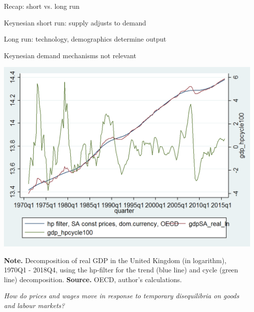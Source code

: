 \documentclass{beamer}
\newcommand{\tb}[1]{{\color{blue}{\textbf{#1}}}}
\newenvironment{mytemize}
{\vfill\itemize[nolistsep,itemsep=\fill,label=\color{blue}{$\triangleright$}]}
  {\enditemize}
\begin{document}
\begin{frame}{Recap: short vs. long run}

\begin{mytemize}
\item Keynesian short run: supply adjusts to demand
\item Long run: technology, demographics determine output
  \begin{mytemize}
	\item Keynesian demand mechanisms not relevant
  \end{mytemize}
  \begin{center}
\includegraphics[trim=0 140 0 0,clip,width=0.55\columnwidth]{FIGURES/8_UKoutputDecomp}
\vspace{0.5mm}
\begin{minipage}{1.0\columnwidth}
\tiny	
\textbf{Note.} Decomposition of real GDP in the United Kingdom (in logarithm), 1970Q1 - 2018Q4, using the hp-filter for the trend (blue line) and cycle (green line) decomposition. \textbf{Source.} OECD, author's calculations.
\end{minipage}
  \end{center}

\item[\tb{Next:}] \emph{How do prices and wages move in response to temporary disequilibria on goods and labour markets?}
\end{mytemize}
\end{frame}
\end{document}
